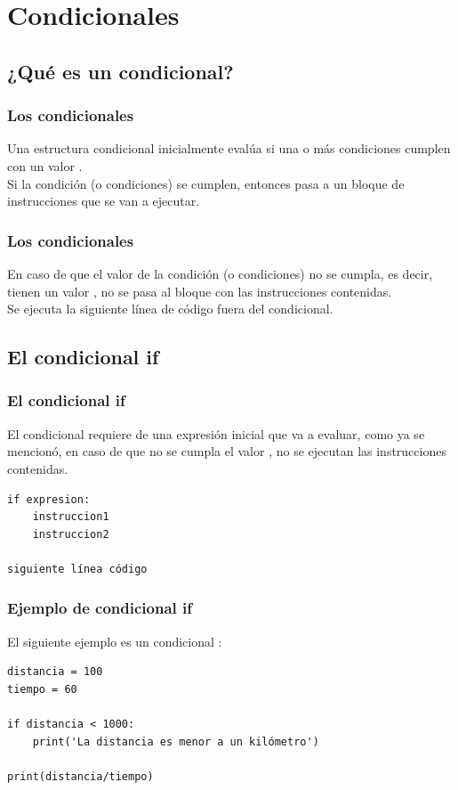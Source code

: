 \documentclass[12pt]{beamer}
\begin{document}
\section{Condicionales}
\subsection{¿Qué es un condicional?}

\begin{frame}
\frametitle{Los condicionales}
Una estructura condicional inicialmente evalúa si una o más condiciones cumplen con un valor .
\\
\bigskip
\pause
Si la condición (o condiciones) se cumplen, entonces pasa a un bloque de instrucciones que se van a ejecutar.
\end{frame}
\begin{frame}
\frametitle{Los condicionales}    
En caso de que el valor de la condición (o condiciones) no se cumpla, \pause es decir, tienen un valor , \pause no se pasa al bloque con las instrucciones contenidas.
\\
\bigskip
\pause
Se ejecuta la siguiente línea de código fuera del condicional.
\end{frame}

\subsection{El condicional if}

\begin{frame}[fragile]
\frametitle{El condicional if}
El condicional  requiere de una expresión inicial que va a evaluar, como ya se mencionó, en caso de que no se cumpla el valor , no se ejecutan las instrucciones contenidas.
\begin{verbatim}
if expresion:
    instruccion1
    instruccion2

siguiente línea código
\end{verbatim}
\end{frame}
\begin{frame}[fragile]
\frametitle{Ejemplo de condicional if}
El siguiente ejemplo es un condicional :
\pause
\begin{lstlisting}[caption=La estructura condicional if]
distancia = 100
tiempo = 60

if distancia < 1000:
    print('La distancia es menor a un kilómetro')

print(distancia/tiempo)
\end{lstlisting}
\end{frame}
\end{document}
